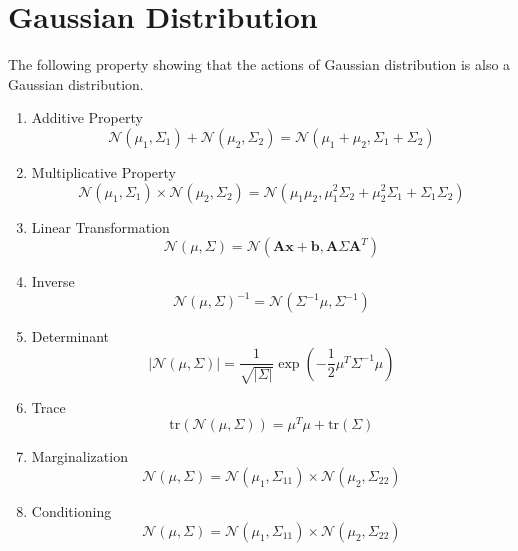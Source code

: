 \section{Gaussian Distribution}
The following property showing that the actions of Gaussian distribution is also a Gaussian distribution.
\begin{enumerate}
    \item Additive Property
    \begin{equation}
        \mathcal{N}(\mu_1, \Sigma_1) + \mathcal{N}(\mu_2, \Sigma_2) = \mathcal{N}(\mu_1 + \mu_2, \Sigma_1 + \Sigma_2)
    \end{equation}
    \item Multiplicative Property
    \begin{equation}
        \mathcal{N}(\mu_1, \Sigma_1) \times \mathcal{N}(\mu_2, \Sigma_2) = \mathcal{N}(\mu_1 \mu_2, \mu_1^2 \Sigma_2 + \mu_2^2 \Sigma_1 + \Sigma_1 \Sigma_2)
    \end{equation}
    \item Linear Transformation
    \begin{equation}
        \mathcal{N}(\mu, \Sigma) = \mathcal{N}(\mathbf{A} \mathbf{x} + \mathbf{b}, \mathbf{A} \Sigma \mathbf{A}^T)

    \end{equation}
    \item Inverse
    \begin{equation}
        \mathcal{N}(\mu, \Sigma)^{-1} = \mathcal{N}(\Sigma^{-1} \mu, \Sigma^{-1})
    \end{equation}
    \item Determinant
    \begin{equation}
        |\mathcal{N}(\mu, \Sigma)| = \frac{1}{\sqrt{|\Sigma|}} \exp \left( - \frac{1}{2} \mu^T \Sigma^{-1} \mu \right)
    \end{equation}
    \item Trace
    \begin{equation}
        \text{tr}(\mathcal{N}(\mu, \Sigma)) = \mu^T \mu + \text{tr}(\Sigma)
    \end{equation}
    \item Marginalization
    \begin{equation}
        \mathcal{N}(\mu, \Sigma) = \mathcal{N}(\mu_1, \Sigma_{11}) \times \mathcal{N}(\mu_2, \Sigma_{22})
    \end{equation}
    \item Conditioning
    \begin{equation}
        \mathcal{N}(\mu, \Sigma) = \mathcal{N}(\mu_1, \Sigma_{11}) \times \mathcal{N}(\mu_2, \Sigma_{22})
    \end{equation}
\end{enumerate}